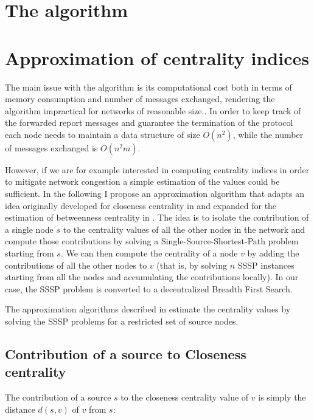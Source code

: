 \section{The \deccen{} algorithm}



\section{Approximation of centrality indices}

The main issue with the \deccen{} algorithm is its computational cost both in terms of memory consumption and number of messages exchanged, rendering the algorithm impractical for networks of reasonable size.. In order to keep track of the forwarded report messages and guarantee the termination of the protocol each node needs to maintain a data structure of size $O(n^2)$, while the number of messages exchanged is $O(n^2m)$.

However, if we are for example interested in computing centrality indices in order to mitigate network congestion a simple estimation of the values could be sufficient. In the following I propose an approximation algorithm that adapts an idea originally developed for closeness centrality in \cite{ew2004} and expanded for the estimation of betweenness centrality in \cite{brandes2007}. The idea is to isolate the contribution of a single node $s$ to the centrality values of all the other nodes in the network and compute those contributions by solving a Single-Source-Shortest-Path problem starting from $s$. We can then compute the centrality of a node $v$ by adding the contributions of all the other nodes to $v$ (that is, by solving $n$ SSSP instances starting from all the nodes and accumulating the contributions locally). In our case, the SSSP problem is converted to a decentralized Breadth First Search.

The approximation algorithms described in \cite{ew2004,brandes2007} estimate the centrality values by solving the SSSP problems for a restricted set of source nodes.

\subsection*{Contribution of a source to Closeness centrality}

The contribution of a source $s$ to the closeness centrality value of $v$ is simply the distance $d(s,v)$ of $v$ from $s$:

